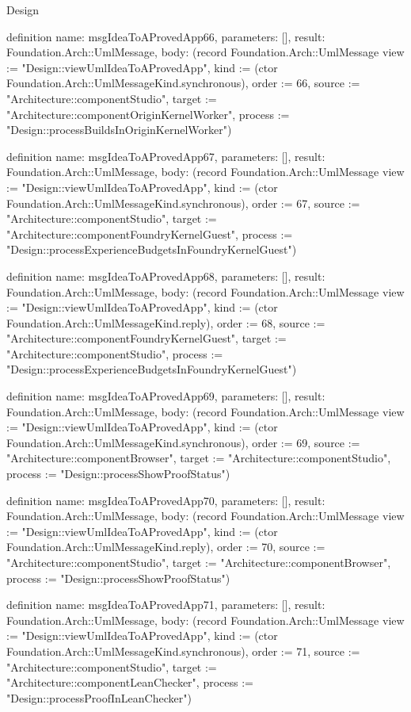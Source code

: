 \begin{lexlean}{Design}
\begin{semanticmodule}
definition{
  name: msgIdeaToAProvedApp66,
  parameters: [],
  result: Foundation.Arch::UmlMessage,
  body: (record Foundation.Arch::UmlMessage {view := "Design::viewUmlIdeaToAProvedApp", kind := (ctor Foundation.Arch::UmlMessageKind.synchronous), order := 66, source := "Architecture::componentStudio", target := "Architecture::componentOriginKernelWorker", process := "Design::processBuildsInOriginKernelWorker"})
}

definition{
  name: msgIdeaToAProvedApp67,
  parameters: [],
  result: Foundation.Arch::UmlMessage,
  body: (record Foundation.Arch::UmlMessage {view := "Design::viewUmlIdeaToAProvedApp", kind := (ctor Foundation.Arch::UmlMessageKind.synchronous), order := 67, source := "Architecture::componentStudio", target := "Architecture::componentFoundryKernelGuest", process := "Design::processExperienceBudgetsInFoundryKernelGuest"})
}

definition{
  name: msgIdeaToAProvedApp68,
  parameters: [],
  result: Foundation.Arch::UmlMessage,
  body: (record Foundation.Arch::UmlMessage {view := "Design::viewUmlIdeaToAProvedApp", kind := (ctor Foundation.Arch::UmlMessageKind.reply), order := 68, source := "Architecture::componentFoundryKernelGuest", target := "Architecture::componentStudio", process := "Design::processExperienceBudgetsInFoundryKernelGuest"})
}

definition{
  name: msgIdeaToAProvedApp69,
  parameters: [],
  result: Foundation.Arch::UmlMessage,
  body: (record Foundation.Arch::UmlMessage {view := "Design::viewUmlIdeaToAProvedApp", kind := (ctor Foundation.Arch::UmlMessageKind.synchronous), order := 69, source := "Architecture::componentBrowser", target := "Architecture::componentStudio", process := "Design::processShowProofStatus"})
}

definition{
  name: msgIdeaToAProvedApp70,
  parameters: [],
  result: Foundation.Arch::UmlMessage,
  body: (record Foundation.Arch::UmlMessage {view := "Design::viewUmlIdeaToAProvedApp", kind := (ctor Foundation.Arch::UmlMessageKind.reply), order := 70, source := "Architecture::componentStudio", target := "Architecture::componentBrowser", process := "Design::processShowProofStatus"})
}

definition{
  name: msgIdeaToAProvedApp71,
  parameters: [],
  result: Foundation.Arch::UmlMessage,
  body: (record Foundation.Arch::UmlMessage {view := "Design::viewUmlIdeaToAProvedApp", kind := (ctor Foundation.Arch::UmlMessageKind.synchronous), order := 71, source := "Architecture::componentStudio", target := "Architecture::componentLeanChecker", process := "Design::processProofInLeanChecker"})
}


\end{semanticmodule}
\end{lexlean}
